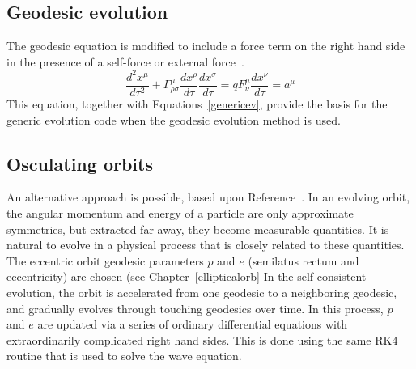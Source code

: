 \subsection{Geodesic evolution}
The geodesic equation is modified to include a force term on the right hand side in the presence of a self-force or external force~\cite{carroll}.
\begin{equation}
  \frac{d^2x^\mu}{d\tau^2}+\Gamma^\mu_{\rho\sigma}\frac{dx^\rho}{d\tau}\frac{dx^\sigma}{d\tau}=qF^\mu_\nu\frac{dx^\nu}{d\tau}=a^\mu
\end{equation}
This equation, together with Equations~\ref{genericev}, provide the basis for the generic evolution code when the geodesic evolution method is used. 

\subsection{Osculating orbits}

An alternative approach is possible, based upon Reference~\cite{pound_poisson}. In an evolving orbit, the angular momentum and energy of a particle are only approximate symmetries, but extracted far away, they become measurable quantities. It is natural to evolve in a physical process that is closely related to these quantities. The eccentric orbit geodesic parameters $p$ and $e$ (semilatus rectum and eccentricity) are chosen (see Chapter~\ref{ellipticalorb} In the self-consistent evolution, the orbit is accelerated from one geodesic to a neighboring geodesic, and gradually evolves through touching geodesics over time. In this process, $p$ and $e$ are updated via a series of ordinary differential equations with extraordinarily complicated right hand sides. This is done using the same RK4 routine that is used to solve the wave equation.






